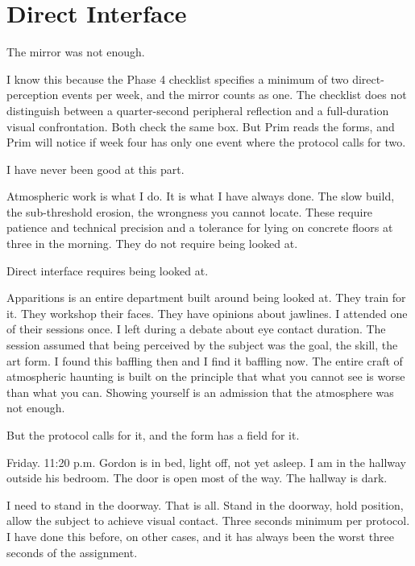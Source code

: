 
\chapter{Direct Interface}

The mirror was not enough.

I know this because the Phase 4 checklist specifies a minimum of two direct-perception events per week, and the mirror counts as one. The checklist does not distinguish between a quarter-second peripheral reflection and a full-duration visual confrontation. Both check the same box. But Prim reads the forms, and Prim will notice if week four has only one event where the protocol calls for two.

I have never been good at this part.

Atmospheric work is what I do. It is what I have always done. The slow build, the sub-threshold erosion, the wrongness you cannot locate. These require patience and technical precision and a tolerance for lying on concrete floors at three in the morning. They do not require being looked at.

Direct interface requires being looked at.

Apparitions is an entire department built around being looked at. They train for it. They workshop their faces. They have opinions about jawlines. I attended one of their sessions once. I left during a debate about eye contact duration. The session assumed that being perceived by the subject was the goal, the skill, the art form. I found this baffling then and I find it baffling now. The entire craft of atmospheric haunting is built on the principle that what you cannot see is worse than what you can. Showing yourself is an admission that the atmosphere was not enough.

But the protocol calls for it, and the form has a field for it.

Friday. 11:20 p.m. Gordon is in bed, light off, not yet asleep. I am in the hallway outside his bedroom. The door is open most of the way. The hallway is dark.

I need to stand in the doorway. That is all. Stand in the doorway, hold position, allow the subject to achieve visual contact. Three seconds minimum per protocol. I have done this before, on other cases, and it has always been the worst three seconds of the assignment.

